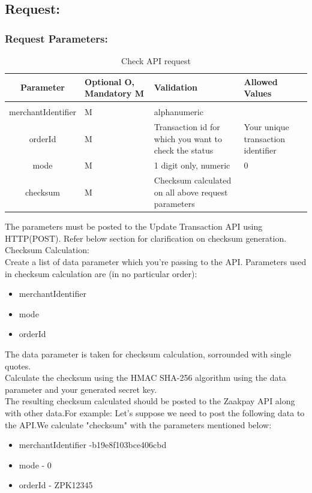 \documentclass{article}
\begin{document}
\subsection{Request:}
\subsubsection{Request Parameters:}
\begin{longtable}{||c| p{2.09cm}| p{5.5cm}| p{4.7cm}||}
  \caption{Check API request}\\
  \rowcolor{green!50}
\bfseries{Parameter} & \bfseries{Optional O, Mandatory M} & \bfseries{Validation} & \bfseries{Allowed Values} \\ \hline
&&&\\
merchantIdentifier & M & alphanumeric &  \\
orderId & M & Transaction id for which you want to check the status & Your unique transaction identifier\\
mode & M & 1 digit only, numeric & 0\\
checksum & M & Checksum calculated on all above request parameters & \\
\end{longtable}

The parameters must be posted to the Update Transaction API using HTTP(POST). Refer below section for clarification on checksum generation.
\\

 Checksum Calculation: \\
Create a list of data parameter which you're passing to the API. Parameters used in checksum calculation are (in no particular order):\\
\begin{itemize}
\item merchantIdentifier
\item mode
\item orderId
\end{itemize}

The data parameter is taken for checksum calculation, sorrounded with single quotes. \\
Calculate the checksum using the HMAC SHA-256 algorithm using the data parameter and your generated secret key.\\
The resulting checksum calculated should be posted to the Zaakpay API along with other data.For example: Let's suppose we need to post the following data to the API.We calculate "checksum" with the parameters mentioned below:\\
\begin{itemize}
\item merchantIdentifier -b19e8f103bce406cbd
\item mode - 0
\item orderId - ZPK12345
\end{itemize}
\end{document}
